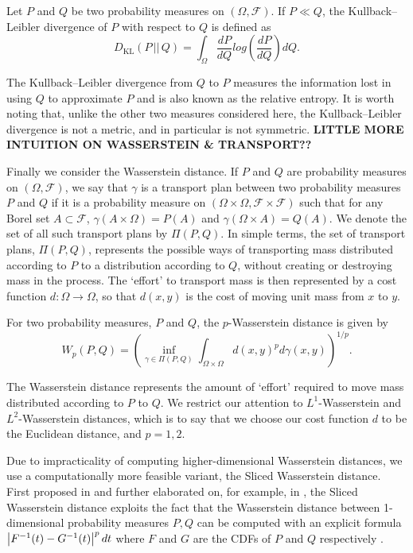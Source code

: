 \begin{defn}
Let $P$ and $Q$ be two probability measures on $(\Omega, \mathcal{F})$.  If $P \ll Q$, the Kullback--Leibler divergence of $P$ with respect to $Q$ is defined as
$$
D_{\text{KL}}(P\,||\,Q) = \int_\Omega \frac{d P}{d Q} log \left(  \frac{d P}{d Q} \right) d Q.
$$
\end{defn}
The Kullback--Leibler divergence from $Q$ to $P$ measures the information lost in using $Q$ to approximate $P$  \cite{anderson2004model} and is also known as the relative entropy.  It is worth noting that, unlike the other two measures considered here, the Kullback--Leibler divergence is not a metric, and in particular is not symmetric.
\textbf{LITTLE MORE INTUITION ON WASSERSTEIN \& TRANSPORT??}

Finally we consider the Wasserstein distance.  If $P$ and $Q$ are probability measures on $(\Omega, \mathcal{F})$, we say that $\gamma$ is a transport plan between two probability measures $P$ and $Q$ if it is a probability measure on $(\Omega \times \Omega, \mathcal{F} \times \mathcal{F})$ such that for any Borel set $A \subset \mathcal{F}$, $\gamma(A \times \Omega)=P(A)$ and $\gamma(\Omega \times A) = Q(A)$.  We denote the set of all such transport plans by $\Pi(P,Q)$.  In simple terms, the set of transport plans, $\Pi(P,Q)$, represents the possible ways of transporting mass distributed according to $P$ to a distribution according to $Q$, without creating or destroying mass in the process.  The `effort' to transport mass is then represented by a cost function $d:\Omega \to \Omega$, so that $d(x,y)$ is the cost of moving unit mass from $x$ to $y$.

\begin{defn}
For two probability measures, $P$ and $Q$, the $p$-Wasserstein distance is given by
$$
W_p(P,Q) = \left( \inf_{\gamma \in \Pi(P,Q)} \int_{\Omega \times \Omega} d(x,y)^p d \gamma(x,y) \right)^{1/p}.
$$
\end{defn}

The Wasserstein distance represents the amount of `effort' required to move mass distributed according to $P$ to $Q$.  We restrict our attention to $L^1$-Wasserstein and $L^2$-Wasserstein distances, which is to say that we choose our cost function $d$ to be the Euclidean distance, and $p=1,2$.

Due to impracticality of computing higher-dimensional Wasserstein distances, we use a computationally more feasible variant, the Sliced Wasserstein distance. First proposed in \cite{rabin2011wasserstein} and further elaborated on, for example, in \cite{gswd}, the Sliced Wasserstein distance exploits the fact that the Wasserstein distance between 1-dimensional probability measures $P, Q$ can be computed with an explicit formula $\abs{F^{-1}(t)-G^{-1}(t)}^p dt$ where $F$ and $G$ are the CDFs of $P$ and $Q$ respectively \cite{ramdas2017wasserstein}.



